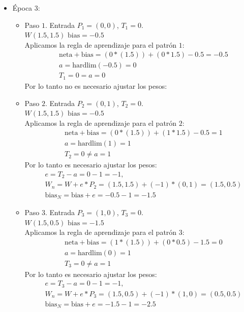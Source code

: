 \documentclass{article}
\begin{document}
{{\begin{itemize}
\item Época 3:

\begin{itemize}
\item Paso $1$. Entrada $P_1 = (0, 0)$, $T_1 = 0$. \\
$W(1.5, 1.5)$  $\text{bias} = -0.5$ \\

Aplicamos la regla de aprendizaje para el patrón $1$:
\begin{align*}
&\text{neta} + \text{bias}= (0 * (1.5)) + (0 * 1.5) - 0.5 = -0.5\\
&a = \text{hardlim}(-0.5) = 0 \\
&T_1 = 0 = a = 0
\end{align*}
Por lo tanto no es necesario ajustar los pesos:

\item Paso $2$. Entrada $P_2 = (0, 1)$, $T_2 = 0$. \\
$W(1.5, 1.5)$  $\text{bias} = -0.5$ \\

Aplicamos la regla de aprendizaje para el patrón $2$:
\begin{align*}
&\text{neta} + \text{bias}= (0 * (1.5)) + (1 * 1.5) - 0.5 = 1\\
&a = \text{hardlim}(1) = 1 \\
&T_2= 0 \neq a = 1
\end{align*}
Por lo tanto es necesario ajustar los pesos:
\begin{align*}
&e = T_2 - a = 0- 1 =  -1, \\
&W_n = W + e* P_2 = (1.5, 1.5) + (-1) * (0,1) = (1.5, 0.5) \\
&\text{bias}_N = \text{bias} + e = -0.5 - 1 = -1.5
\end{align*}

\item Paso $3$. Entrada $P_3 = (1, 0)$, $T_3 = 0$. \\
$W(1.5, 0.5)$  $\text{bias} = -1.5$ \\

Aplicamos la regla de aprendizaje para el patrón $3$:
\begin{align*}
&\text{neta} + \text{bias}= (1 * (1.5)) + (0 * 0.5) - 1.5 = 0\\
&a = \text{hardlim}(0) = 1 \\
&T_3 = 0 \neq a = 1
\end{align*}
Por lo tanto es necesario ajustar los pesos:
\begin{align*}
&e = T_3 - a = 0 - 1 =  -1, \\
&W_n = W + e* P_3 = (1.5, 0.5) + (-1) * (1, 0) = (0.5, 0.5) \\
&\text{bias}_N = \text{bias} + e = -1.5 - 1 = -2.5
\end{align*}


\end{itemize}
\end{itemize}}}
\end{document}
